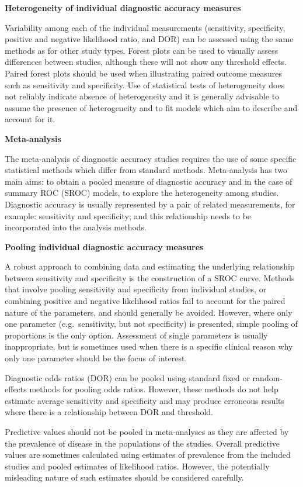 \documentclass[
  10pt,
  a4paper,
  DIV=11,
  numbers=noendperiod]{scrreprt}
\begin{document}
\textbf{Heterogeneity of individual diagnostic accuracy measures}

Variability among each of the individual measurements (sensitivity,
specificity, positive and negative likelihood ratio, and DOR) can be
assessed using the same methods as for other study types. Forest plots
can be used to visually assess differences between studies, although
these will not show any threshold effects. Paired forest plots should be
used when illustrating paired outcome measures such as sensitivity and
specificity. Use of statistical tests of heterogeneity does not reliably
indicate absence of heterogeneity and it is generally advisable to
assume the presence of heterogeneity and to fit models which aim to
describe and account for it.

\textbf{Meta-analysis}

The meta-analysis of diagnostic accuracy studies requires the use of
some specific statistical methods which differ from standard methods.
Meta-analysis has two main aims: to obtain a pooled measure of
diagnostic accuracy and in the case of summary ROC (SROC) models, to
explore the heterogeneity among studies. Diagnostic accuracy is usually
represented by a pair of related measurements, for example: sensitivity
and specificity; and this relationship needs to be incorporated into the
analysis methods.

\textbf{Pooling individual diagnostic accuracy measures}

A robust approach to combining data and estimating the underlying
relationship between sensitivity and specificity is the construction of
a SROC curve. Methods that involve pooling sensitivity and specificity
from individual studies, or combining positive and negative likelihood
ratios fail to account for the paired nature of the parameters, and
should generally be avoided. However, where only one parameter
(e.g.~sensitivity, but not specificity) is presented, simple pooling of
proportions is the only option. Assessment of single parameters is
usually inappropriate, but is sometimes used when there is a specific
clinical reason why only one parameter should be the focus of interest.

Diagnostic odds ratios (DOR) can be pooled using standard fixed or
random-effects methods for pooling odds ratios. However, these methods
do not help estimate average sensitivity and specificity and may produce
erroneous results where there is a relationship between DOR and
threshold.

Predictive values should not be pooled in meta-analyses as they are
affected by the prevalence of disease in the populations of the studies.
Overall predictive values are sometimes calculated using estimates of
prevalence from the included studies and pooled estimates of likelihood
ratios. However, the potentially misleading nature of such estimates
should be considered carefully.
\end{document}
